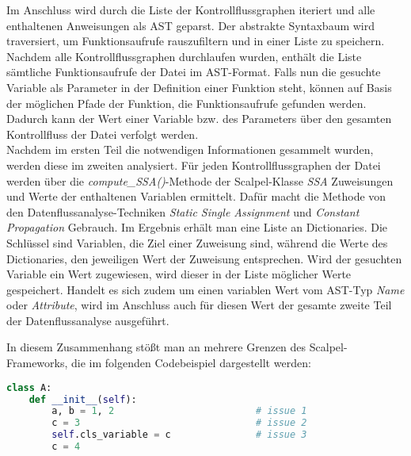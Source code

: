 \documentclass[german,bachelor]{swsLeipzig}
\begin{document}
Im Anschluss wird durch die Liste der Kontrollflussgraphen iteriert und alle enthaltenen Anweisungen als AST geparst.
Der abstrakte Syntaxbaum wird traversiert, um Funktionsaufrufe rauszufiltern und in einer Liste zu speichern.
Nachdem alle Kontrollflussgraphen durchlaufen wurden, enthält die Liste sämtliche Funktionsaufrufe der Datei im AST-Format.
Falls nun die gesuchte Variable als Parameter in der Definition einer Funktion steht, können auf Basis der möglichen Pfade
der Funktion, die Funktionsaufrufe gefunden werden.
Dadurch kann der Wert einer Variable bzw. des Parameters über den gesamten Kontrollfluss der Datei verfolgt werden.\\

Nachdem im ersten Teil die notwendigen Informationen gesammelt wurden, werden diese im zweiten analysiert.
Für jeden Kontrollflussgraphen der Datei werden über die \textit{compute\_SSA()}-Methode der Scalpel-Klasse \textit{SSA} Zuweisungen
und Werte der enthaltenen Variablen ermittelt.
Dafür macht die Methode von den Datenflussanalyse-Techniken \textit{Static Single Assignment} und \textit{Constant Propagation}
Gebrauch.
Im Ergebnis erhält man eine Liste an Dictionaries.
Die Schlüssel sind Variablen, die Ziel einer Zuweisung sind, während die Werte des Dictionaries, den jeweiligen Wert der Zuweisung
entsprechen.
Wird der gesuchten Variable ein Wert zugewiesen, wird dieser in der Liste möglicher Werte gespeichert.
Handelt es sich zudem um einen variablen Wert vom AST-Typ \textit{Name} oder \textit{Attribute}, wird im Anschluss auch für diesen Wert
der gesamte zweite Teil der Datenflussanalyse ausgeführt.

In diesem Zusammenhang stößt man an mehrere Grenzen des Scalpel-Frameworks, die im folgenden Codebeispiel dargestellt werden:\\
\begin{lstlisting}[language=Python, frame=single, basicstyle=\small]
class A:
    def __init__(self):
        a, b = 1, 2                         # issue 1
        c = 3                               # issue 2
        self.cls_variable = c               # issue 3
        c = 4
\end{lstlisting}
\
\end{document}
